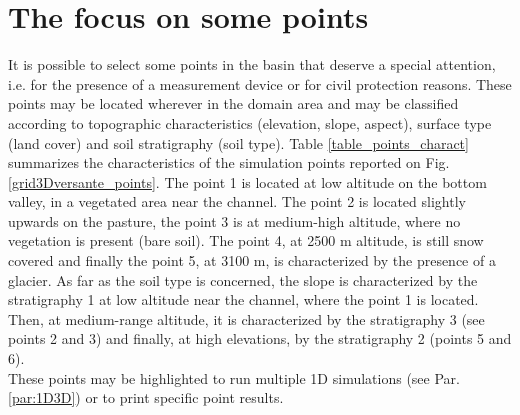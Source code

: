 
\section{The focus on some points}\label{par:focusPoints}

It is possible to select some points in the basin that deserve a special attention, i.e. for the presence of a measurement device or for civil protection reasons. These points may be located wherever in the domain area and may be classified according to topographic characteristics (elevation, slope, aspect), surface type (land cover) and soil stratigraphy (soil type). Table \ref{table_points_charact} summarizes the characteristics of the simulation points reported on Fig. \ref{grid3Dversante_points}. The point 1 is located at low altitude on the bottom valley, in a vegetated area near the channel. The point 2 is located slightly upwards on the pasture, the point 3 is at medium-high altitude, where no vegetation is present (bare soil). The point 4, at 2500 m altitude, is still snow covered and finally the point 5, at 3100 m, is characterized by the presence of a glacier. As far as the soil type is concerned, the slope is characterized by the stratigraphy 1 at low altitude near the channel, where the point 1 is located. Then, at medium-range altitude, it is characterized by the stratigraphy 3 (see points 2 and 3) and finally, at high elevations, by the stratigraphy 2 (points 5 and 6).\\
These points may be highlighted to run multiple 1D simulations (see Par. \ref{par:1D3D}) or to print specific point results.


